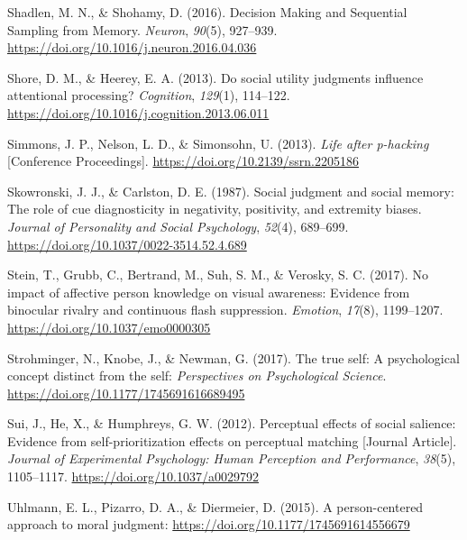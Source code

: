 \documentclass[
  man]{apa6}
\newlength{\cslhangindent}
\newlength{\cslentryspacingunit} %
\newenvironment{CSLReferences}[2] %
 {%
  \setlength{\parindent}{0pt}
  \ifodd #1
  \let\oldpar\par
  \def\par{\hangindent=\cslhangindent\oldpar}
  \fi
  \setlength{\parskip}{#2\cslentryspacingunit}
 }%
 {}
\begin{document}
\begin{CSLReferences}{1}{0}
\leavevmode{}%
Shadlen, M. N., \& Shohamy, D. (2016). Decision {Making} and {Sequential} {Sampling} from {Memory}. \emph{Neuron}, \emph{90}(5), 927--939. \url{https://doi.org/10.1016/j.neuron.2016.04.036}

\leavevmode{}%
Shore, D. M., \& Heerey, E. A. (2013). Do social utility judgments influence attentional processing? \emph{Cognition}, \emph{129}(1), 114--122. \url{https://doi.org/10.1016/j.cognition.2013.06.011}

\leavevmode{}%
Simmons, J. P., Nelson, L. D., \& Simonsohn, U. (2013). \emph{Life after p-hacking} {[}Conference Proceedings{]}. \url{https://doi.org/10.2139/ssrn.2205186}

\leavevmode{}%
Skowronski, J. J., \& Carlston, D. E. (1987). Social judgment and social memory: The role of cue diagnosticity in negativity, positivity, and extremity biases. \emph{Journal of Personality and Social Psychology}, \emph{52}(4), 689--699. \url{https://doi.org/10.1037/0022-3514.52.4.689}

\leavevmode{}%
Stein, T., Grubb, C., Bertrand, M., Suh, S. M., \& Verosky, S. C. (2017). No impact of affective person knowledge on visual awareness: Evidence from binocular rivalry and continuous flash suppression. \emph{Emotion}, \emph{17}(8), 1199--1207. \url{https://doi.org/10.1037/emo0000305}

\leavevmode{}%
Strohminger, N., Knobe, J., \& Newman, G. (2017). The true self: A psychological concept distinct from the self: \emph{Perspectives on Psychological Science}. \url{https://doi.org/10.1177/1745691616689495}

\leavevmode{}%
Sui, J., He, X., \& Humphreys, G. W. (2012). Perceptual effects of social salience: Evidence from self-prioritization effects on perceptual matching {[}Journal Article{]}. \emph{Journal of Experimental Psychology: Human Perception and Performance}, \emph{38}(5), 1105--1117. \url{https://doi.org/10.1037/a0029792}

\leavevmode{}%
Uhlmann, E. L., Pizarro, D. A., \& Diermeier, D. (2015). A person-centered approach to moral judgment: \url{https://doi.org/10.1177/1745691614556679}


\end{CSLReferences}
\end{document}
